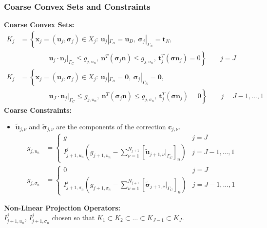 \documentclass[8pt, oneside]{beamer}   	%
\newcommand{\bc}{\textbf{c}}
\newcommand{\bn}{\textbf{n}}
\newcommand{\bt}{\textbf{t}}
\newcommand{\bu}{\textbf{u}}
\newcommand{\bbx}{\textbf{x}}
\newcommand{\bsigma}{\boldsymbol{\sigma}}
\begin{document}
\begin{frame}
\frametitle{\textbf{Coarse Convex Sets and Constraints}}
\footnotesize
{ \textbf{Coarse Convex Sets:}}
\begin{align*}
  K_j&=\left\lbrace
  \bbx_j=(\bu_j, \bsigma_j) \in X_j: \: \bu_j|_{\Gamma_D}=\bu_D , \:  \bsigma_j|_{\Gamma_N}=\bt_N, \right. \\
   & \left.
    \qquad \qquad  
  \: \bu_j\cdot \bn_j|_{\Gamma_C}\leq g_{j,u_n}, \: \bn^T(\bsigma_j \bn)  \leq g_{j,\sigma_n}, \: \bt_j^T(\bsigma \bn_j) =0
  \right\rbrace  \qquad j=J\\
  K_j&=\left\lbrace
  \bbx_j=(\bu_j, \bsigma_j) \in X_j: \: \bu_j|_{\Gamma_D}=\textbf{0} , \:  \bsigma_j|_{\Gamma_N}=\textbf{0}, \right. \\
   & \left.
    \qquad \qquad  
  \: \bu_J\cdot \bn_j|_{\Gamma_C}\leq g_{j,u_n}, \: \bn^T(\bsigma_j \bn)  \leq g_{j,\sigma_n}, \: \bt_j^T(\bsigma \bn_j) =0
  \right\rbrace  \qquad j=J-1,...,1
\end{align*}
{ \textbf{Coarse Constraints:}}
\begin{itemize}
\item
$\tilde{\bu}_{j,\nu}$ and $\tilde{\bsigma}_{j,\nu}$ are the components of the correction $\bc_{j,\nu}$.
 \begin{align*}
{ g_{j,u_n}}&=
\begin{cases}
g & j=J \\
I_{j+1,u_n}^j \left( g_{j+1,u_n} - \sum_{\nu=1}^{N_{j+1}} \left[ \tilde{\bu}_{j+1,\nu} |_{\Gamma_C} \right]_n\right) & j=J-1,...,1
\end{cases}\\
{ g_{j,\sigma_n}}&=
\begin{cases}
0 & j=J \\
I_{j+1,\sigma_n}^j \left( g_{j+1,\sigma_n} - \sum_{\nu=1}^{N_{j+1}}  \left[ \tilde{\bsigma}_{j+1,\nu} |_{\Gamma_C}\right]_n \right) & j=J-1,...,1
\end{cases}
\end{align*}
\end{itemize}
{ \textbf{Non-Linear Projection Operators:}}\\
$   I_{j+1,u_n}^j $, $   I_{j+1,\sigma_n}^j $ chosen so that ${   K_1 \subset K_2 \subset ... \subset K_{J-1}\subset K_J}$.
\end{frame}






\end{document}
